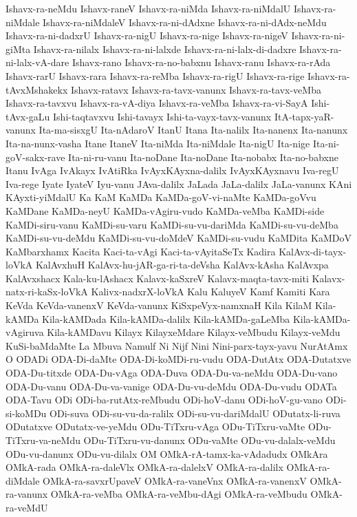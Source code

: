 {Ishavx-ra-neMdu
Ishavx-raneV
Ishavx-ra-niMda
Ishavx-ra-niMdalU
Ishavx-ra-niMdale
Ishavx-ra-niMdaleV
Ishavx-ra-ni-dAdxne
Ishavx-ra-ni-dAdx-neMdu
Ishavx-ra-ni-dadxrU
Ishavx-ra-nigU
Ishavx-ra-nige
Ishavx-ra-nigeV
Ishavx-ra-ni-giMta
Ishavx-ra-nilalx
Ishavx-ra-ni-lalxde
Ishavx-ra-ni-lalx-di-dadxre
Ishavx-ra-ni-lalx-vA-dare
Ishavx-rano
Ishavx-ra-no-babxnu
Ishavx-ranu
Ishavx-ra-rAda
Ishavx-rarU
Ishavx-rara
Ishavx-ra-reMba
Ishavx-ra-rigU
Ishavx-ra-rige
Ishavx-ra-tAvxMshakekx
Ishavx-ratavx
Ishavx-ra-tavx-vanunx
Ishavx-ra-tavx-veMba
Ishavx-ra-tavxvu
Ishavx-ra-vA-diya
Ishavx-ra-veMba
Ishavx-ra-vi-SayA
Ishi-tAvx-gaLu
Ishi-taqtavxvu
Ishi-tavayx
Ishi-ta-vayx-tavx-vanunx
ItA-tapx-yaR-vanunx
Ita-ma-sisxgU
Ita-nAdaroV
ItanU
Itana
Ita-nalilx
Ita-nanenx
Ita-nanunx
Ita-na-nunx-vasha
Itane
ItaneV
Ita-niMda
Ita-niMdale
Ita-nigU
Ita-nige
Ita-ni-goV-sakx-rave
Ita-ni-ru-vanu
Ita-noDane
Ita-noDane
Ita-nobabx
Ita-no-babxne
Itanu
IvAga
IvAkayx
IvAtiRka
IvAyxKAyxna-dalilx
IvAyxKAyxnavu
Iva-regU
Iva-rege
Iyate
IyateV
Iyu-vanu
JAva-dalilx
JaLada
JaLa-dalilx
JaLa-vanunx
KAni
KAyxti-yiMdalU
Ka
KaM
KaMDa
KaMDa-goV-vi-naMte
KaMDa-goVvu
KaMDane
KaMDa-neyU
KaMDa-vAgiru-vudo
KaMDa-veMba
KaMDi-side
KaMDi-siru-vanu
KaMDi-su-varu
KaMDi-su-vu-dariMda
KaMDi-su-vu-deMba
KaMDi-su-vu-deMdu
KaMDi-su-vu-doMdeV
KaMDi-su-vudu
KaMDita
KaMDoV
KaMbarxhamx
Kacita
Kaci-ta-vAgi
Kaci-ta-vAyitaSeTx
Kadira
KalAvx-di-tayx-loVkA
KalAvxhuH
KalAvx-hu-jAR-ga-ri-ta-deVsha
KalAvx-kAsha
KalAvxpa
KalAvxshacx
Kala-ku-lAshacx
Kalavx-kaSxreV
Kalavx-maqta-tavx-miti
Kalavx-natx-ri-kaSx-loVkA
Kalivx-nadxrX-loVkA
Kalu
KaluyeV
Kamf
Kamiti
Kara
KeVda
KeVda-vanenxV
KeVda-vanunx
KiSxpeVyx-namxnaH
Kila
KilaM
Kila-kAMDa
Kila-kAMDada
Kila-kAMDa-dalilx
Kila-kAMDa-gaLeMba
Kila-kAMDa-vAgiruva
Kila-kAMDavu
Kilayx
KilayxeMdare
Kilayx-veMbudu
Kilayx-veMdu
KuSi-baMdaMte
La
Mbuva
Namulf
Ni
Nijf
Nini
Nini-parx-tayx-yavu
NurAtAmx
O
ODADi
ODA-Di-daMte
ODA-Di-koMDi-ru-vudu
ODA-DutAtx
ODA-Dutatxve
ODA-Du-titxde
ODA-Du-vAga
ODA-Duva
ODA-Du-va-neMdu
ODA-Du-vano
ODA-Du-vanu
ODA-Du-va-vanige
ODA-Du-vu-deMdu
ODA-Du-vudu
ODATa
ODA-Tavu
ODi
ODi-ba-rutAtx-reMbudu
ODi-hoV-danu
ODi-hoV-gu-vano
ODi-si-koMDu
ODi-suva
ODi-su-vu-da-ralilx
ODi-su-vu-dariMdalU
ODutatx-li-ruva
ODutatxve
ODutatx-ve-yeMdu
ODu-TiTxru-vAga
ODu-TiTxru-vaMte
ODu-TiTxru-va-neMdu
ODu-TiTxru-vu-danunx
ODu-vaMte
ODu-vu-dalalx-veMdu
ODu-vu-danunx
ODu-vu-dilalx
OM
OMkA-rA-tamx-ka-vAdadudx
OMkAra
OMkA-rada
OMkA-ra-daleVlx
OMkA-ra-dalelxV
OMkA-ra-dalilx
OMkA-ra-diMdale
OMkA-ra-savxrUpaveV
OMkA-ra-vaneVnx
OMkA-ra-vanenxV
OMkA-ra-vanunx
OMkA-ra-veMba
OMkA-ra-veMbu-dAgi
OMkA-ra-veMbudu
OMkA-ra-veMdU
}
